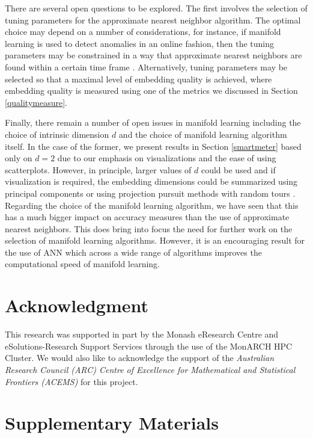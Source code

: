 \documentclass[11pt,a4paper,]{article}
\begin{document}
There are several open questions to be explored. The first involves the selection of tuning parameters for the approximate nearest neighbor algorithm. The optimal choice may depend on a number of considerations, for instance, if manifold learning is used to detect anomalies in an online fashion, then the tuning parameters may be constrained in a way that approximate nearest neighbors are found within a certain time frame \autocite{Talagala2020-ck}. Alternatively, tuning parameters may be selected so that a maximal level of embedding quality is achieved, where embedding quality is measured using one of the metrics we discussed in Section \ref{qualitymeasure}.

Finally, there remain a number of open issues in manifold learning including the choice of intrinsic dimension \(d\) \autocite{Denti2021-jl} and the choice of manifold learning algorithm itself. In the case of the former, we present results in Section \ref{smartmeter} based only on \(d=2\) due to our emphasis on visualizations and the ease of using scatterplots. However, in principle, larger values of \(d\) could be used and if visualization is required, the embedding dimensions could be summarized using principal components or using projection pursuit methods with random tours \autocite{Cook1995-jx,Laa2020-qx}. Regarding the choice of the manifold learning algorithm, we have seen that this has a much bigger impact on accuracy measures than the use of approximate nearest neighbors. This does bring into focus the need for further work on the selection of manifold learning algorithms. However, it is an encouraging result for the use of ANN which across a wide range of algorithms improves the computational speed of manifold learning.

\hypertarget{acknowledgment}{%
\section*{Acknowledgment}\label{acknowledgment}}

This research was supported in part by the Monash eResearch Centre and eSolutions-Research Support Services through the use of the MonARCH HPC Cluster.
We would also like to acknowledge the support of the \emph{Australian Research Council (ARC) Centre of Excellence for Mathematical and Statistical Frontiers (ACEMS)} for this project.

\hypertarget{supplementary-materials}{%
\section*{Supplementary Materials}\label{supplementary-materials}}
\end{document}
